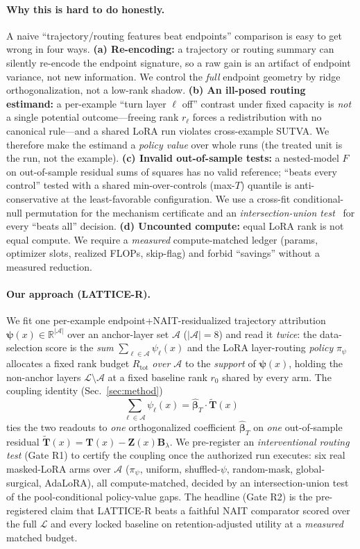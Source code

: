 \documentclass[11pt]{article}
\theoremstyle{definition}
\newcommand{\Tmat}{\mathbf{T}}
\newcommand{\Ttil}{\widetilde{\mathbf{T}}}
\newcommand{\Zmat}{\mathbf{Z}}
\newcommand{\Blam}{\mathbf{B}_{\lambda}}
\newcommand{\R}{\mathbb{R}}
\newcommand{\Aset}{\mathcal{A}}
\newcommand{\Lset}{\mathcal{L}}
\newcommand{\psivec}{\bm{\psi}}
\newcommand{\Rtot}{R_{\mathrm{tot}}}
\begin{document}
\paragraph{Why this is hard to do honestly.}
A naive ``trajectory/routing features beat endpoints'' comparison is easy to get wrong
in four ways. \textbf{(a) Re-encoding:} a trajectory or routing summary can silently
re-encode the endpoint signature, so a raw gain is an artifact of endpoint variance, not
new information. We control the \emph{full} endpoint geometry by ridge orthogonalization,
not a low-rank shadow. \textbf{(b) An ill-posed routing estimand:} a per-example
``turn layer $\ell$ off'' contrast under fixed capacity is \emph{not} a single potential
outcome---freeing rank $r_\ell$ forces a redistribution with no canonical rule---and a
shared LoRA run violates cross-example SUTVA. We therefore make the estimand a
\emph{policy value} over whole runs (the treated unit is the run, not the example).
\textbf{(c) Invalid out-of-sample tests:} a nested-model $F$ on out-of-sample residual
sums of squares has no valid reference; ``beats every control'' tested with a shared
min-over-controls (max-$T$) quantile is anti-conservative at the least-favorable
configuration. We use a cross-fit conditional-null permutation for the mechanism
certificate and an \emph{intersection-union test}~\cite{berger1982iut} for every
``beats all'' decision. \textbf{(d) Uncounted compute:} equal LoRA rank is not equal
compute. We require a \emph{measured} compute-matched ledger (params, optimizer slots,
realized FLOPs, skip-flag) and forbid ``savings'' without a measured reduction.

\paragraph{Our approach (LATTICE-R).}
We fit one per-example endpoint+NAIT-residualized trajectory attribution
$\psivec(x)\in\R^{|\Aset|}$ over an anchor-layer set $\Aset$ ($|\Aset|=8$) and read it
\emph{twice}: the data-selection score is the \emph{sum} $\sum_{\ell\in\Aset}\psi_\ell(x)$
and the LoRA layer-routing \emph{policy} $\pi_\psi$ allocates a fixed rank budget $\Rtot$
\emph{over $\Aset$} to the \emph{support} of $\psivec(x)$, holding the non-anchor layers
$\Lset\setminus\Aset$ at a fixed baseline rank $r_0$ shared by every arm. The coupling
identity (Sec.~\ref{sec:method})
\[
\textstyle\sum_{\ell\in\Aset}\psi_\ell(x)=\hat{\bm\beta}_T\cdot\Ttil(x)
\]
ties the two readouts to \emph{one} orthogonalized coefficient $\hat{\bm\beta}_T$ on
\emph{one} out-of-sample residual $\Ttil(x)=\Tmat(x)-\Zmat(x)\Blam$. We pre-register an
\emph{interventional routing test} (Gate R1) to certify the coupling once the authorized
run executes: six real masked-LoRA arms over $\Aset$ ($\pi_\psi$, uniform,
shuffled-$\psi$, random-mask, global-surgical, AdaLoRA), all compute-matched, decided by
an intersection-union test of the pool-conditional policy-value gaps. The headline (Gate
R2) is the pre-registered claim that LATTICE-R beats a
faithful NAIT comparator scored over the full $\Lset$ and every locked baseline on
retention-adjusted utility at a \emph{measured} matched budget.
\end{document}
